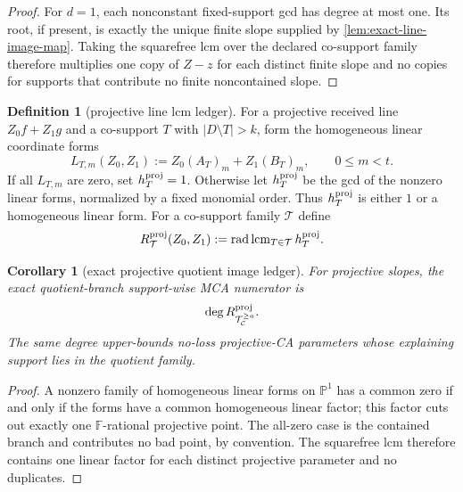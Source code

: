 \documentclass[11pt]{article}
\newtheorem{corollary}[corollary]{Corollary}
\theoremstyle{definition}
\newtheorem{definition}[definition]{Definition}
\theoremstyle{remark}
\newcommand{\F}{\mathbb{F}}
\begin{document}
\begin{proof}
For $d=1$, each nonconstant fixed-support gcd has degree at most one.  Its root,
if present, is exactly the unique finite slope supplied by
\cref{lem:exact-line-image-map}.  Taking the squarefree lcm over the declared
co-support family therefore multiplies one copy of $Z-z$ for each distinct
finite slope and no copies for supports that contribute no finite noncontained
slope.
\end{proof}

\begin{definition}[projective line lcm ledger]
\label{def:projective-line-lcm-ledger}
For a projective received line $Z_0f+Z_1g$ and a co-support $T$ with
$|D\setminus T|>k$, form the homogeneous linear coordinate forms
\[
        L_{T,m}(Z_0,Z_1):=Z_0(A_T)_m+Z_1(B_T)_m,
        \qquad 0\le m<t .
\]
If all $L_{T,m}$ are zero, set $h_T^{\rm proj}=1$.  Otherwise let
$h_T^{\rm proj}$ be the gcd of the nonzero linear forms, normalized by a fixed
monomial order.  Thus $h_T^{\rm proj}$ is either $1$ or a homogeneous linear
form.  For a co-support family $\mathcal T$ define
\[
        R_{\mathcal T}^{\rm proj}(Z_0,Z_1)
        :=\operatorname{rad}\operatorname{lcm}_{T\in\mathcal T}h_T^{\rm proj}.
\]
\end{definition}

\begin{corollary}[exact projective quotient image ledger]
\label{cor:projective-line-lcm-ledger}
For projective slopes, the exact quotient-branch support-wise MCA numerator is
\[
        \deg R_{\mathcal T_{\mathcal C}^{\ge a}}^{\rm proj}.
\]
The same degree upper-bounds no-loss projective-CA parameters whose explaining
support lies in the quotient family.
\end{corollary}

\begin{proof}
A nonzero family of homogeneous linear forms on $\mathbb P^1$ has a common zero
if and only if the forms have a common homogeneous linear factor; this factor
cuts out exactly one $\F$-rational projective point.  The all-zero case is the
contained branch and contributes no bad point, by convention.  The squarefree
lcm therefore contains one linear factor for each distinct projective parameter
and no duplicates.
\end{proof}
\end{document}
